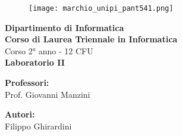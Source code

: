 \begin{titlepage} %
\begin{figure}[t] %
    \centering\texttt{[image: marchio\_unipi\_pant541.png]}
\end{figure}
\vspace{20mm}

\begin{Large}
 \begin{center}
	\textbf{Dipartimento di Informatica\\ Corso di Laurea Triennale in Informatica\\}
	\vspace{20mm}
    {\LARGE{Corso 2° anno - 12 CFU}}\\
	\vspace{10mm}
	{\huge{\bf Laboratorio II}}\\
\end{center}
\end{Large}


\vspace{36mm}
\begin{minipage}[t]{0.47\textwidth}
	{\large{\bf Professori:}\\ \large{Prof. Giovanni Manzini}}
\end{minipage}
\hfill
\begin{minipage}[t]{0.47\textwidth}\raggedleft
	{\large{\bf Autori:}\\ \large{Filippo Ghirardini}}
\end{minipage}

\vspace{25mm}

\hrulefill

\vspace{5mm}


\end{titlepage}